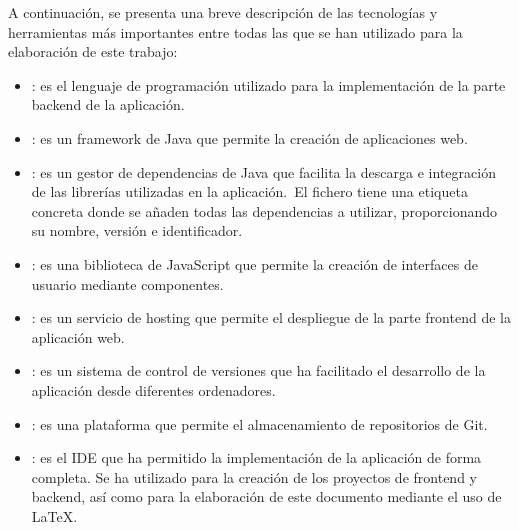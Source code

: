 A continuación, se presenta una breve descripción de las tecnologías y herramientas más importantes entre todas las que
se han utilizado para la elaboración de este trabajo:

\begin{itemize}
	\item {}: es el lenguaje de programación utilizado para la implementación de la parte backend de la
	aplicación.
	\item {}: es un framework de Java que permite la creación de aplicaciones web.
	\item {}: es un gestor de dependencias de Java que facilita la descarga e integración de las
	librerías utilizadas en la aplicación.\ El fichero  tiene una etiqueta concreta donde se añaden
	todas las dependencias a utilizar, proporcionando su nombre, versión e identificador.
	\item {}: es una biblioteca de JavaScript que permite la creación de interfaces de usuario mediante
	componentes.
	\item {}: es un servicio de hosting que permite el despliegue de la parte frontend de la
	aplicación web.
	\item {}: es un sistema de control de versiones que ha facilitado el desarrollo de la aplicación desde
	diferentes ordenadores.
	\item {}: es una plataforma que permite el almacenamiento de repositorios de Git.
	\item {}: es el IDE que ha permitido la implementación de la aplicación de forma completa.
	Se ha utilizado para la creación de los proyectos de frontend y backend, así como para la
	elaboración de este documento mediante el uso de \LaTeX.
\end{itemize}
